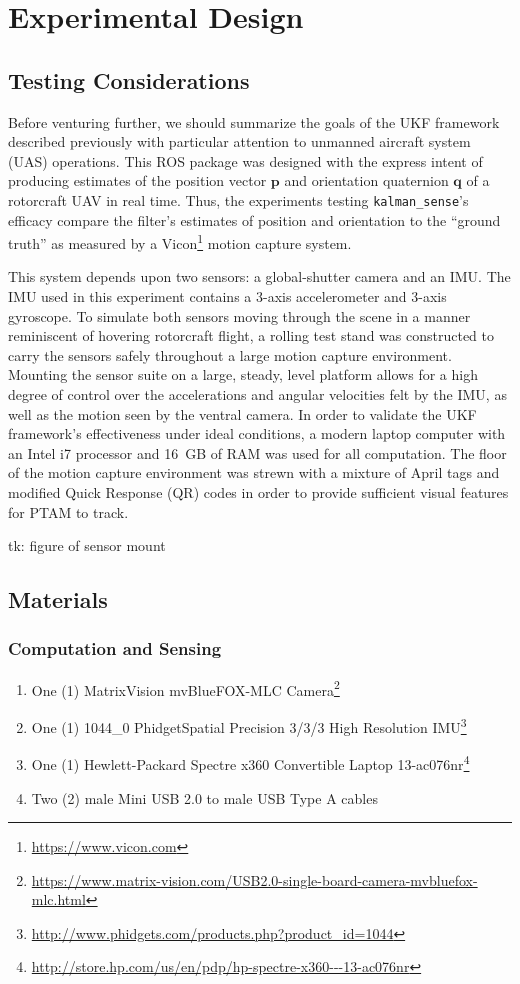 \chapter{Experimental Design}

\section{Testing Considerations}

Before venturing further, we should summarize the goals of the UKF framework described previously with particular attention to unmanned aircraft system (UAS) operations. This ROS package was designed with the express intent of producing estimates of the position vector $\mathbf{p}$ and orientation quaternion $\mathbf{q}$ of a rotorcraft UAV in real time. Thus, the experiments testing \texttt{kalman\_sense}'s efficacy compare the filter's estimates of position and orientation to the ``ground truth'' as measured by a Vicon\footnote{\url{https://www.vicon.com}} motion capture system.

This system depends upon two sensors: a global-shutter camera and an IMU. The IMU used in this experiment contains a 3-axis accelerometer and 3-axis gyroscope. To simulate both sensors moving through the scene in a manner reminiscent of hovering rotorcraft flight, a rolling test stand was constructed to carry the sensors safely throughout a large motion capture environment. Mounting the sensor suite on a large, steady, level platform allows for a high degree of control over the accelerations and angular velocities felt by the IMU, as well as the motion seen by the ventral camera. In order to validate the UKF framework's effectiveness under ideal conditions, a modern laptop computer with an Intel i7 processor and 16~GB of RAM was used for all computation. The floor of the motion capture environment was strewn with a mixture of April tags and modified Quick Response (QR) codes in order to provide sufficient visual features for PTAM to track.

tk: figure of sensor mount

\section{Materials}
\subsection{Computation and Sensing}
\begin{enumerate}
\item One (1) MatrixVision mvBlueFOX-MLC Camera\footnote{\url{https://www.matrix-vision.com/USB2.0-single-board-camera-mvbluefox-mlc.html}}
\item One (1) 1044\_0 PhidgetSpatial Precision 3/3/3 High Resolution IMU\footnote{\url{http://www.phidgets.com/products.php?product_id=1044}}
\item One (1) Hewlett-Packard Spectre x360 Convertible Laptop 13-ac076nr\footnote{\url{http://store.hp.com/us/en/pdp/hp-spectre-x360---13-ac076nr}}
\item Two (2) male Mini USB 2.0 to male USB Type A cables
\end{enumerate}

